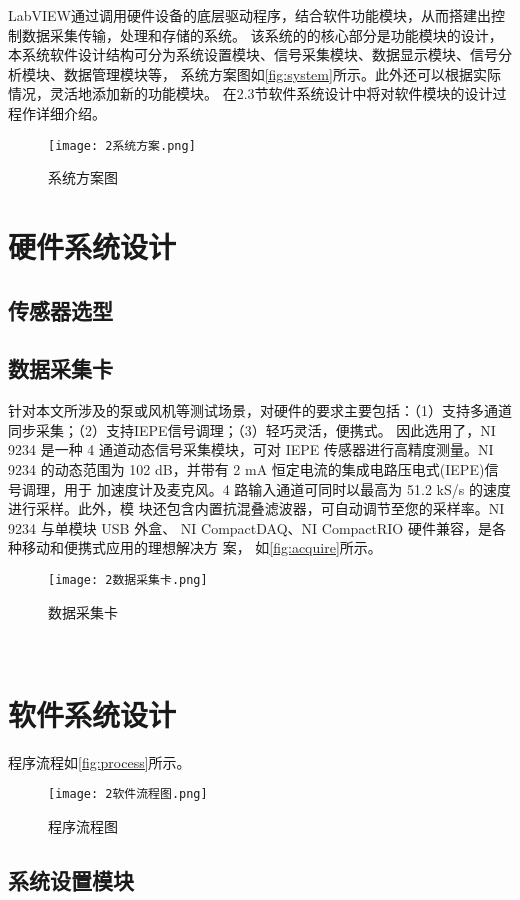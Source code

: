 LabVIEW通过调用硬件设备的底层驱动程序，结合软件功能模块，从而搭建出控制数据采集传输，处理和存储的系统。
该系统的的核心部分是功能模块的设计，本系统软件设计结构可分为系统设置模块、信号采集模块、数据显示模块、信号分析模块、数据管理模块等，
系统方案图如\autoref{fig:system}所示。此外还可以根据实际情况，灵活地添加新的功能模块。
在2.3节软件系统设计中将对软件模块的设计过程作详细介绍。
\begin{figure}[htbp]
    \centering
    \texttt{[image: 2系统方案.png]}
    \caption{\label{fig:system}系统方案图}
\end{figure}

\section{硬件系统设计}
\subsection{传感器选型}

\subsection{数据采集卡}
针对本文所涉及的泵或风机等测试场景，对硬件的要求主要包括：（1）支持多通道同步采集；（2）支持IEPE信号调理；（3）轻巧灵活，便携式。
因此选用了​，NI 9234 是一种 4 通道动态信号采集模块，可对 IEPE 传感器进行高精度测量。NI 9234
的动态范围为 102 dB，并带有 2 mA 恒定电流的集成电路压电式(IEPE)信号调理，用于
加速度计及麦克风。4 路输入通道可同时以最高为 51.2 kS/s 的速度进行采样。此外，模
块还包含内置抗混叠滤波器，可自动调节至您的采样率。NI 9234 与单模块 USB 外盒、
NI CompactDAQ、NI CompactRIO 硬件兼容，是各种移动和便携式应用的理想解决方
案，
如\autoref{fig:acquire}所示。
\begin{figure}[htbp]
    \centering
    \texttt{[image: 2数据采集卡.png]}
    \caption{\label{fig:acquire}数据采集卡}
\end{figure}
​

\section{软件系统设计}

程序流程如\autoref{fig:process}所示。

\begin{figure}[htbp]
    \centering
    \texttt{[image: 2软件流程图.png]}
    \caption{\label{fig:process}程序流程图}
\end{figure}
\subsection{系统设置模块}
